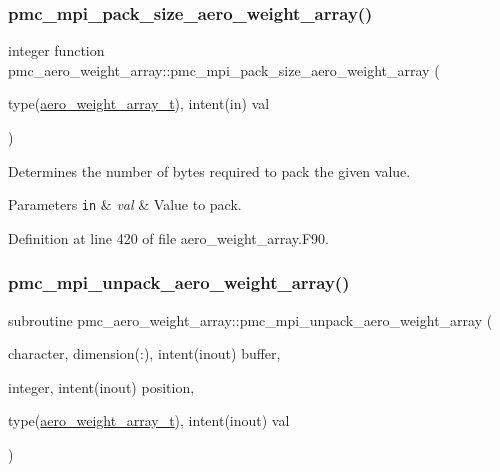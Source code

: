 \subsubsection{\texorpdfstring{pmc\+\_\+mpi\+\_\+pack\+\_\+size\+\_\+aero\+\_\+weight\+\_\+array()}{pmc\_mpi\_pack\_size\_aero\_weight\_array()}}
{\footnotesize\ttfamily integer function pmc\+\_\+aero\+\_\+weight\+\_\+array\+::pmc\+\_\+mpi\+\_\+pack\+\_\+size\+\_\+aero\+\_\+weight\+\_\+array (\begin{DoxyParamCaption}\item[{type(\mbox{\hyperlink{structpmc__aero__weight__array_1_1aero__weight__array__t}{aero\+\_\+weight\+\_\+array\+\_\+t}}), intent(in)}]{val }\end{DoxyParamCaption})}



Determines the number of bytes required to pack the given value. 


\begin{DoxyParams}[1]{Parameters}
\mbox{\tt in}  & {\em val} & Value to pack. \\
\hline
\end{DoxyParams}


Definition at line 420 of file aero\+\_\+weight\+\_\+array.\+F90.

\mbox{\label{namespacepmc__aero__weight__array_a8f07bda93e7ef86eb3f39034f8b8e5f2}} 
\subsubsection{\texorpdfstring{pmc\+\_\+mpi\+\_\+unpack\+\_\+aero\+\_\+weight\+\_\+array()}{pmc\_mpi\_unpack\_aero\_weight\_array()}}
{\footnotesize\ttfamily subroutine pmc\+\_\+aero\+\_\+weight\+\_\+array\+::pmc\+\_\+mpi\+\_\+unpack\+\_\+aero\+\_\+weight\+\_\+array (\begin{DoxyParamCaption}\item[{character, dimension(\+:), intent(inout)}]{buffer,  }\item[{integer, intent(inout)}]{position,  }\item[{type(\mbox{\hyperlink{structpmc__aero__weight__array_1_1aero__weight__array__t}{aero\+\_\+weight\+\_\+array\+\_\+t}}), intent(inout)}]{val }\end{DoxyParamCaption})}




